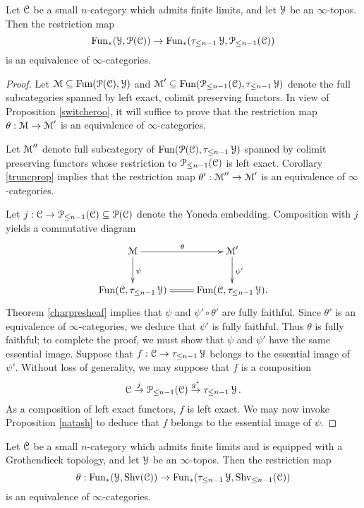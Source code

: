 \begin{lemma}\label{eoi1}
Let $\operatorname{\mathcal{C}}$ be a small $n$-category which admits finite limits, and let $\operatorname{\mathcal{Y}}$ be an $\infty$-topos.
Then the restriction map
$$ \operatorname{Fun}_{\ast}(\operatorname{\mathcal{Y}}, \operatorname{\mathcal{P}}(\operatorname{\mathcal{C}}) ) \rightarrow \operatorname{Fun}_{\ast}( \tau_{\leq n-1} \operatorname{\mathcal{Y}}, \operatorname{\mathcal{P}}_{\leq n-1}(\operatorname{\mathcal{C}}) )$$
is an equivalence of $\infty$-categories.
\end{lemma}

\begin{proof}
Let $\operatorname{\mathcal{M}} \subseteq \operatorname{Fun}(\operatorname{\mathcal{P}}(\operatorname{\mathcal{C}}), \operatorname{\mathcal{Y}})$ and
$\operatorname{\mathcal{M}}' \subseteq \operatorname{Fun}(\operatorname{\mathcal{P}}_{\leq n-1}(\operatorname{\mathcal{C}}) , \tau_{\leq n-1} \operatorname{\mathcal{Y}})$
denote the full subcategories spanned by left exact, colimit preserving functors. 
In view of Proposition \ref{switcheroo}, it will suffice to prove that the restriction map
$\theta: \operatorname{\mathcal{M}} \rightarrow \operatorname{\mathcal{M}}'$ is an equivalence of $\infty$-categories.

Let $\operatorname{\mathcal{M}}''$ denote full subcategory of $\operatorname{Fun}(\operatorname{\mathcal{P}}(\operatorname{\mathcal{C}}), \tau_{\leq n-1} \operatorname{\mathcal{Y}})$ spanned by
colimit preserving functors whose restriction to $\operatorname{\mathcal{P}}_{\leq n-1}(\operatorname{\mathcal{C}})$ is left exact. 
Corollary \ref{truncprop} implies that the restriction map $\theta': \operatorname{\mathcal{M}}'' \rightarrow \operatorname{\mathcal{M}}'$
is an equivalence of $\infty$-categories.

Let $j: \operatorname{\mathcal{C}} \rightarrow \operatorname{\mathcal{P}}_{\leq n-1}(\operatorname{\mathcal{C}}) \subseteq \operatorname{\mathcal{P}}(\operatorname{\mathcal{C}})$ denote the Yoneda embedding. Composition with $j$ yields a commutative diagram
$$ \xymatrix{ \calM \ar[r]^{\theta} \ar[d]^{\psi} & \calM' \ar[d]^{\psi'} \\
\Fun(\calC,\tau_{\leq n-1} \calY) \ar@{=}[r] & \Fun(\calC,\tau_{\leq n-1} \calY). }$$
Theorem \ref{charpresheaf} implies that $\psi$ and $\psi' \circ \theta'$ are fully faithful. Since $\theta'$ is an equivalence of $\infty$-categories, we deduce that $\psi'$ is fully faithful.
Thus $\theta$ is fully faithful; to complete the proof, we must show that $\psi$ and $\psi'$ have the same essential image. Suppose that $f: \operatorname{\mathcal{C}} \rightarrow \tau_{\leq n-1} \operatorname{\mathcal{Y}}$ belongs to the essential image of $\psi'$. Without loss of generality, we may suppose that $f$ is a composition
$$ \operatorname{\mathcal{C}} \stackrel{j}{\rightarrow} \operatorname{\mathcal{P}}_{\leq n-1}(\operatorname{\mathcal{C}}) \stackrel{g^{\ast}}{\rightarrow} \tau_{\leq n-1} \operatorname{\mathcal{Y}}. $$
As a composition of left exact functors, $f$ is left exact. We may now invoke Proposition \ref{natash} to deduce that $f$ belongs to the essential image of $\psi$.
\end{proof}

\begin{lemma}\label{eoi2}
Let $\operatorname{\mathcal{C}}$ be a small $n$-category which admits finite limits and is equipped with a Grothendieck topology, and let $\operatorname{\mathcal{Y}}$ be an $\infty$-topos.
Then the restriction map
$$ \theta: \operatorname{Fun}_{\ast}(\operatorname{\mathcal{Y}}, \operatorname{Shv}(\operatorname{\mathcal{C}}) ) \rightarrow \operatorname{Fun}_{\ast}( \tau_{\leq n-1} \operatorname{\mathcal{Y}}, \operatorname{Shv}_{\leq n-1}(\operatorname{\mathcal{C}}) )$$
is an equivalence of $\infty$-categories.
\end{lemma}

